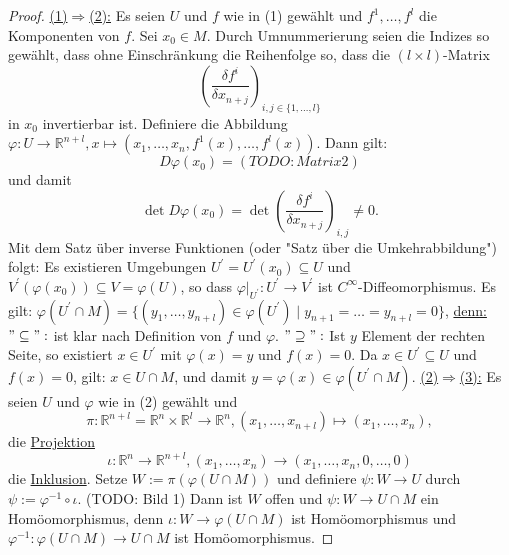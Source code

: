 \documentclass[a4paper,11pt,notitlepage]{report}
\newcommand{\R}{{\ensuremath{\mathbb{R}}}}
\begin{document}
\begin{proof}
		\underline{(1)$\Rightarrow$(2):} Es seien $U$ und $f$ wie in (1) gewählt und $f^1, \ldots, f^l$ die Komponenten von $f$. Sei $x_0 \in M$. Durch Umnummerierung seien die Indizes so gewählt, dass ohne Einschränkung die Reihenfolge so, dass die $(l \times l)$-Matrix 
		$$\left(\frac{\delta f^i}{\delta x_{n+j}}\right)_{i,j \in \{1, \ldots, l\}}$$
		in $x_0$ invertierbar ist.
		Definiere die Abbildung $\varphi \colon U \rightarrow \R^{n+l}, x \mapsto (x_1, \ldots, x_n, f^1(x), \ldots, f^l(x))$.
		Dann gilt:
		$$D \varphi(x_0)= (TODO:Matrix 2)$$ und damit 
		$$\det{D \varphi(x_0)} = \det{\left(\frac{\delta f^i}{\delta x_{n+j}}\right)_{i,j}} \neq 0.$$
		Mit dem Satz über inverse Funktionen (oder "Satz über die Umkehrabbildung") folgt:
		Es existieren Umgebungen $U^\prime = U^\prime(x_0) \subseteq U$ und $V^\prime(\varphi(x_0)) \subseteq V = \varphi(U)$, so dass
		$\varphi \big |_{U^\prime} \colon U^\prime \rightarrow V^\prime$ ist $C^\infty$-Diffeomorphismus.
		\newline
		Es gilt: $\varphi(U^\prime \cap M) = \{(y_1, \ldots, y_{n+l}) \in \varphi(U^\prime) \mid y_{n+1} = \ldots = y_{n+l}=0\}$,
		\underline{denn:} \newline $"\subseteq":$ ist klar nach Definition von $f$ und $\varphi$.
		\newline
		$"\supseteq":$ Ist $y$ Element der rechten Seite, so existiert $x \in U^\prime$ mit $\varphi(x)=y$ und $f(x)=0$. Da $x \in U^\prime \subseteq U$ und $f(x)=0$, gilt: $x \in U \cap M$, und damit $y = \varphi(x) \in \varphi(U^\prime \cap M)$.
		\newline
		 \underline{(2)$\Rightarrow$(3):} Es seien $U$ und $\varphi$ wie in (2) gewählt und
		 $$\pi \colon \R^{n+l} = \R^n \times \R^l \rightarrow \R^n, (x_1, \ldots, x_{n+l}) \mapsto (x_1, \ldots, x_n),$$
		 die \underline{Projektion}
		 $$\iota \colon \R^n \rightarrow \R^{n+l}, (x_1, \ldots, x_n) \rightarrow (x_1, \ldots, x_n, 0, \ldots, 0)$$ die \underline{Inklusion}.
		 \newline
		 Setze $W := \pi(\varphi(U \cap M))$ und definiere $\psi \colon W \rightarrow U$ durch $\psi := \varphi^{-1} \circ \iota$.
		 \newline
		 (TODO: Bild 1)
		 \newline
		 Dann ist $W$ offen und $\psi \colon W \rightarrow U \cap M$ ein Homöomorphismus, denn $\iota \colon W \rightarrow \varphi(U \cap M)$ ist Homöomorphismus und $\varphi^{-1} \colon \varphi(U \cap M) \rightarrow U \cap M$ ist Homöomorphismus.
		 \newline

\end{proof}
\end{document}
